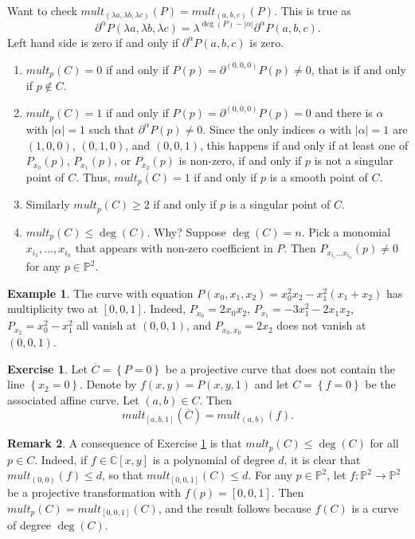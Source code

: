 \documentclass{article}
\newcommand{\C}{\mathbb{C}}
\renewcommand{\P}{\mathbb{P}}
\newcommand{\rb}[1]{\left( #1 \right)}
\renewcommand{\sb}[1]{\left[ #1 \right]}
\newcommand{\cb}[1]{\left\{ #1 \right\}}
\newcommand{\abs}[1]{\left\lvert #1 \right\rvert}
\theoremstyle{definition}\newtheorem{definition}{Definition}[section]
\theoremstyle{definition}\newtheorem{notation}[definition]{Notation}
\theoremstyle{definition}\newtheorem{remark}[definition]{Remark}
\theoremstyle{definition}\newtheorem{example}[definition]{Example}
\theoremstyle{definition}\newtheorem{fact}{Fact}
\theoremstyle{definition}\newtheorem{exercise}{Exercise}
\begin{document}
Want to check $ mult_{\rb{\lambda a, \lambda b, \lambda c}}\rb{P} = mult_{\rb{a, b, c}}\rb{P} $. This is true as
$$ \partial^\alpha P\rb{\lambda a, \lambda b, \lambda c} = \lambda^{\deg\rb{P} - \abs{\alpha}}\partial^\alpha P\rb{a, b, c}. $$
Left hand side is zero if and only if $ \partial^\alpha P\rb{a, b, c} $ is zero.
\begin{enumerate}
\item $ mult_p\rb{C} = 0 $ if and only if $ P\rb{p} = \partial^{\rb{0, 0, 0}} P\rb{p} \ne 0 $, that is if and only if $ p \notin C $.
\item $ mult_p\rb{C} = 1 $ if and only if $ P\rb{p} = \partial^{\rb{0, 0, 0}} P\rb{p} = 0 $ and there is $ \alpha $ with $ \abs{\alpha} = 1 $ such that $ \partial^{\alpha} P\rb{p} \ne 0 $. Since the only indices $ \alpha $ with $ \abs{\alpha} = 1 $ are $ \rb{1, 0, 0} $, $ \rb{0, 1, 0} $, and $ \rb{0, 0, 1} $, this happens if and only if at least one of $ P_{x_0}\rb{p} $, $ P_{x_1}\rb{p} $, or $ P_{x_2}\rb{p} $ is non-zero, if and only if $ p $ is not a singular point of $ C $. Thus, $ mult_p\rb{C} = 1 $ if and only if $ p $ is a smooth point of $ C $.
\item Similarly $ mult_p\rb{C} \ge 2 $ if and only if $ p $ is a singular point of $ C $.
\item $ mult_p\rb{C} \le \deg\rb{C} $. Why? Suppose $ \deg\rb{C} = n $. Pick a monomial $ x_{i_1}, \dots, x_{i_n} $ that appears with non-zero coefficient in $ P $. Then $ P_{x_{i_1} \dots x_{i_n}}\rb{p} \ne 0 $ for any $ p \in \P^2 $.
\end{enumerate}

\begin{example}
The curve with equation $ P\rb{x_0, x_1, x_2} = x_0^2x_2 - x_1^2\rb{x_1 + x_2} $ has multiplicity two at $ \sb{0, 0, 1} $. Indeed, $ P_{x_0} = 2x_0x_2 $, $ P_{x_1} = -3x_1^2 - 2x_1x_2 $, $ P_{x_2} = x_0^2 - x_1^2 $ all vanish at $ \rb{0, 0, 1} $, and $ P_{x_0, x_0} = 2x_2 $ does not vanish at $ \rb{0, 0, 1} $.
\end{example}

\begin{exercise}
\label{ex:32}
Let $ \overline{C} = \cb{P = 0} $ be a projective curve that does not contain the line $ \cb{x_2 = 0} $. Denote by $ f\rb{x, y} = P\rb{x, y, 1} $ and let $ C = \cb{f = 0} $ be the associated affine curve. Let $ \rb{a, b} \in C $. Then
$$ mult_{\sb{a, b, 1}}\rb{\overline{C}} = mult_{\rb{a, b}}\rb{f}. $$
\end{exercise}

\begin{remark}
\label{rem:11.4}
A consequence of Exercise \ref{ex:32} is that $ mult_p\rb{C} \le \deg\rb{C} $ for all $ p \in C $. Indeed, if $ f \in \C\sb{x, y} $ is a polynomial of degree $ d $, it is clear that $ mult_{\rb{0, 0}}\rb{f} \le d $, so that $ mult_{\sb{0, 0, 1}}\rb{C} \le d $. For any $ p \in \P^2 $, let $ f : \P^2 \to \P^2 $ be a projective transformation with $ f\rb{p} = \sb{0, 0, 1} $. Then $ mult_p\rb{C} = mult_{\sb{0, 0, 1}}\rb{C} $, and the result follows because $ f\rb{C} $ is a curve of degree $ \deg\rb{C} $.
\end{remark}
\end{document}
